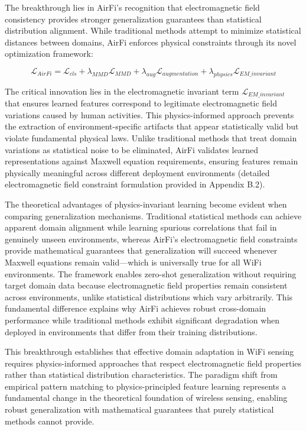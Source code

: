 \documentclass[journal]{IEEEtran}
\begin{document}
The breakthrough lies in AirFi's recognition that electromagnetic field consistency provides stronger generalization guarantees than statistical distribution alignment. While traditional methods attempt to minimize statistical distances between domains, AirFi enforces physical constraints through its novel optimization framework:

$$\mathcal{L}_{AirFi} = \mathcal{L}_{cls} + \lambda_{MMD} \mathcal{L}_{MMD} + \lambda_{aug} \mathcal{L}_{augmentation} + \lambda_{physics} \mathcal{L}_{EM\_invariant}$$

The critical innovation lies in the electromagnetic invariant term $\mathcal{L}_{EM\_invariant}$ that ensures learned features correspond to legitimate electromagnetic field variations caused by human activities. This physics-informed approach prevents the extraction of environment-specific artifacts that appear statistically valid but violate fundamental physical laws. Unlike traditional methods that treat domain variations as statistical noise to be eliminated, AirFi validates learned representations against Maxwell equation requirements, ensuring features remain physically meaningful across different deployment environments (detailed electromagnetic field constraint formulation provided in Appendix B.2).

The theoretical advantages of physics-invariant learning become evident when comparing generalization mechanisms. Traditional statistical methods can achieve apparent domain alignment while learning spurious correlations that fail in genuinely unseen environments, whereas AirFi's electromagnetic field constraints provide mathematical guarantees that generalization will succeed whenever Maxwell equations remain valid—which is universally true for all WiFi environments. The framework enables zero-shot generalization without requiring target domain data because electromagnetic field properties remain consistent across environments, unlike statistical distributions which vary arbitrarily. This fundamental difference explains why AirFi achieves robust cross-domain performance while traditional methods exhibit significant degradation when deployed in environments that differ from their training distributions.

This breakthrough establishes that effective domain adaptation in WiFi sensing requires physics-informed approaches that respect electromagnetic field properties rather than statistical distribution characteristics. The paradigm shift from empirical pattern matching to physics-principled feature learning represents a fundamental change in the theoretical foundation of wireless sensing, enabling robust generalization with mathematical guarantees that purely statistical methods cannot provide.
\end{document}
